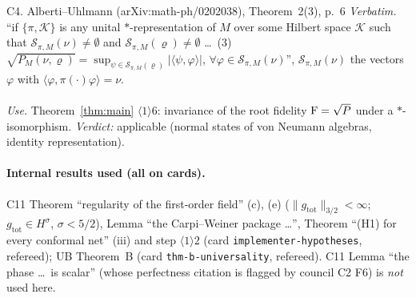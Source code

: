 \documentclass[11pt]{article}
\newcommand{\norm}[1]{\lVert#1\rVert}
\newcommand{\gtot}{g_{\mathrm{tot}}}
\begin{document}
\begin{citedbox}{C4. Alberti--Uhlmann (arXiv:math-ph/0202038), Theorem~2(3), p.~6}
\emph{Verbatim.} ``if $\{\pi,\mathcal K\}$ is any unital $*$-representation of $M$ over some Hilbert space
$\mathcal K$ such that $\mathcal S_{\pi,M}(\nu)\ne\emptyset$ and $\mathcal S_{\pi,M}(\varrho)\ne\emptyset$ \dots\
(3) $\sqrt{P_M(\nu,\varrho)}=\sup_{\psi\in\mathcal S_{\pi,M}(\varrho)}|\langle\psi,\varphi\rangle|$,
$\forall\varphi\in\mathcal S_{\pi,M}(\nu)$'', $\mathcal S_{\pi,M}(\nu)$ the vectors $\varphi$ with
$\langle\varphi,\pi(\cdot)\varphi\rangle=\nu$.\\[2pt]
\\[2pt]
\emph{Use.} Theorem~\ref{thm:main} $\langle1\rangle6$: invariance of the root fidelity $\operatorname{F}=\sqrt{P}$ under a $*$-isomorphism.
\emph{Verdict:} applicable (normal states of von Neumann algebras, identity representation).
\end{citedbox}

\paragraph{Internal results used (all on cards).}  C11 Theorem ``regularity of the first-order field'' (c), (e)
($\norm{\gtot}_{3/2}<\infty$; $\gtot\in H^\sigma$, $\sigma<5/2$), Lemma ``the Carpi--Weiner package \dots'',
Theorem ``(H1) for every conformal net'' (iii) and step $\langle1\rangle2$ (card \texttt{implementer-hypotheses},
refereed); UB Theorem~B (card \texttt{thm-b-universality}, refereed).  C11 Lemma ``the phase \dots\ is scalar''
(whose perfectness citation is flagged by council C2 F6) is \emph{not} used here.
\end{document}
